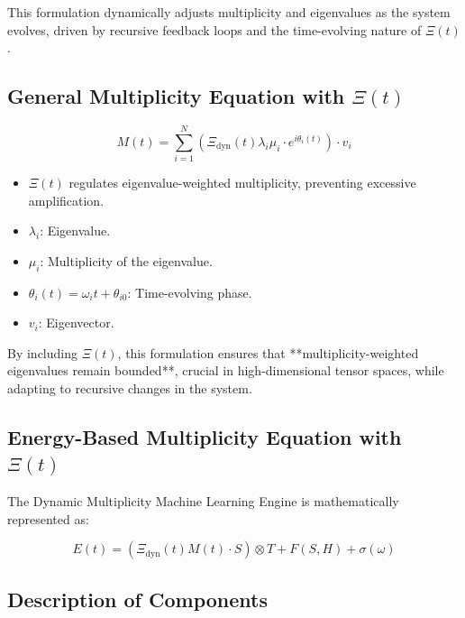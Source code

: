 \documentclass{article}
\theoremstyle{plain}
\begin{document}
\begin{itemize}
This formulation dynamically adjusts multiplicity and eigenvalues as the system evolves, driven by recursive feedback loops and the time-evolving nature of \(\Xi(t) \).

\subsection{General Multiplicity Equation with \(\Xi(t) \)}

\begin{equation}
M(t) = \sum_{i=1}^N \left( \Xi_{\text{dyn}}(t) \lambda_i \mu_i \cdot e^{i\theta_i(t)} \right) \cdot v_i
\end{equation}

\begin{itemize}
    \item \(\Xi(t) \) regulates eigenvalue-weighted multiplicity, preventing excessive amplification.
    \item \( \lambda_i \): Eigenvalue.
    \item \( \mu_i \): Multiplicity of the eigenvalue.
    \item \( \theta_i(t) = \omega_i t + \theta_{i0} \): Time-evolving phase.
    \item \( v_i \): Eigenvector.
\end{itemize}

By including \(\Xi(t) \), this formulation ensures that **multiplicity-weighted eigenvalues remain bounded**, crucial in high-dimensional tensor spaces, while adapting to recursive changes in the system.

\subsection{Energy-Based Multiplicity Equation with \(\Xi(t) \)}

The Dynamic Multiplicity Machine Learning Engine is mathematically represented as:

\begin{equation}
E(t) = (\Xi_{\text{dyn}}(t) M(t) \cdot S) \otimes T + F(S, H) + \sigma(\omega)
\end{equation}

\subsection{Description of Components}


\end{itemize}
\end{document}
